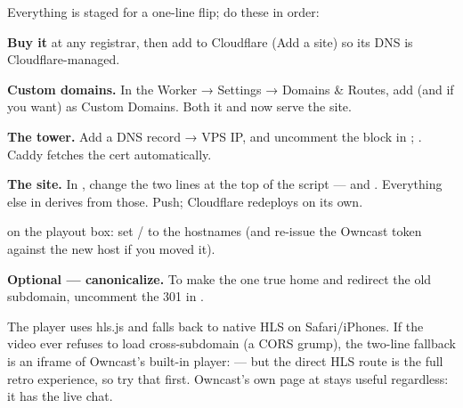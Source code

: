 \documentclass[fontpath=fonts/,logopath=logo/]{riposte-doc}
\begin{document}
Everything is staged for a one-line flip; do these in order:

\begin{ripnumbers}
\item \textbf{Buy it} at any registrar, then add  to Cloudflare (Add a site) so its DNS is Cloudflare-managed.
\item \textbf{Custom domains.} In the  Worker → Settings → Domains \& Routes, add  (and  if you want) as Custom Domains. Both it and  now serve the site.
\item \textbf{The tower.} Add a DNS record  → VPS IP, and uncomment the  block in ; . Caddy fetches the cert automatically.
\item \textbf{The site.} In , change the two lines at the top of the script —  and . Everything else in  derives from those. Push; Cloudflare redeploys on its own.
\item \textbf{} on the playout box: set  /  to the  hostnames (and re-issue the Owncast token against the new host if you moved it).
\item \textbf{Optional — canonicalize.} To make  the one true home and redirect the old subdomain, uncomment the 301 in .
\end{ripnumbers}

The player uses hls.js and falls back to native HLS on Safari/iPhones. If the video ever refuses to load cross-subdomain (a CORS grump), the two-line fallback is an iframe of Owncast's built-in player:  — but the direct HLS route is the full retro experience, so try that first. Owncast's own page at  stays useful regardless: it has the live chat.
\end{document}
